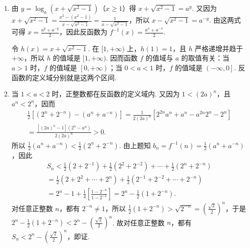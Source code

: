 \begin{solution}
\begin{enumerate}
\item 由 \(y=\log_a\left(x+\sqrt{x^2-1}\right)\)（\(x\geqslant1\)）得 \(x+\sqrt{x^2-1}=a^y\). 又因为
\(x+\sqrt{x^2-1}=\frac{x^2-(x^2-1)}{x-\sqrt{x^2-1}}=\frac{1}{x-\sqrt{x^2-1}}\)，所以 \(x-\sqrt{x^2-1}=a^{-y}\). 由这两式可得 \(x=\frac{a^y+a^{-y}}{2}\)，因此反函数为 \(f^{-1}(x)=\frac{a^x+a^{-x}}{2}\).

令 \(h(x)=x+\sqrt{x^2-1}\). 在 \([1,+\infty)\) 上，\(h(1)=1\)，且 \(h\) 严格递增并趋于 \(+\infty\)，所以 \(h\) 的值域是 \([1,+\infty)\). 因而函数 \(f\) 的值域与 \(a\) 的取值有关：当 \(a>1\) 时，\(f\) 的值域是 \(\left[0,+\infty\right)\)；当 \(0<a<1\) 时，\(f\) 的值域是 \(\left(-\infty,0\right]\). 反函数的定义域分别就是这两个区间.

\item 当 \(1<a<2\) 时，正整数都在反函数的定义域内. 又因为 \(1<(2a)^n\)，且 \(a^n<2^n\)，因而
\[
\begin{gathered}
\frac{1}{2}\left[(2^n+2^{-n})-(a^n+a^{-n})\right]=\frac{1}{2(2a)^n}\left[2^{2n}a^n+a^n-a^{2n}2^n-2^n\right] \\
=\frac{\left[(2a)^n-1\right]\left(2^n-a^n\right)}{2(2a)^n}>0.
\end{gathered}
\]
所以 \(\frac{1}{2}(a^n+a^{-n})<\frac{1}{2}(2^n+2^{-n})\). 由上题知 \(b_n=f^{-1}(n)=\frac{1}{2}(a^n+a^{-n})\)，因此
\[
\begin{gathered}
S_n<\frac{1}{2}(2+2^{-1})+\frac{1}{2}(2^2+2^{-2})+\cdots+\frac{1}{2}(2^n+2^{-n}) \\
=\frac{1}{2}(2+2^2+\cdots+2^n)+\frac{1}{2}(2^{-1}+2^{-2}+\cdots+2^{-n}) \\
=2^n-1+\frac{1}{4}\left[\frac{1-2^{-n}}{1-2^{-1}}\right]=2^n-\frac{1}{2}(1+2^{-n}).
\end{gathered}
\]
对任意正整数 \(n\)，都有 \(2^{-n}\neq1\)，所以 \(\frac{1}{2}(1+2^{-n})>\sqrt{2^{-n}}=\left(\frac{\sqrt{2}}{2}\right)^n\)，于是 \(2^n-\frac{1}{2}(1+2^{-n})<2^n-\left(\frac{\sqrt{2}}{2}\right)^n\). 故对任意正整数 \(n\)，都有 \(S_n<2^n-\left(\frac{\sqrt{2}}{2}\right)^n\)，即证.
\end{enumerate}
\end{solution}
